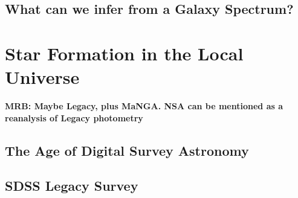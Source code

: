 \subsection{What can we infer from a Galaxy Spectrum?}

\section{Star Formation in the Local Universe}

{\bf MRB: Maybe Legacy, plus MaNGA. NSA can be mentioned
as a reanalysis of Legacy photometry}

\subsection{The Age of Digital Survey Astronomy}

\subsection{SDSS Legacy Survey}




